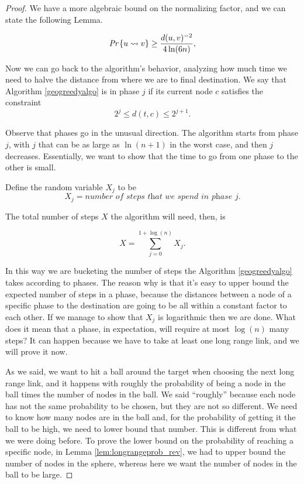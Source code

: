 \begin{proof}
We have a more algebraic bound on the normalizing factor, and we can state the following Lemma.
\begin{lem}\label{lem:longrangeprob_rev}
\begin{equation}
\emph{Pr}\left\{u \rightsquigarrow v\right\} \geq \frac{d(u, v)^{-2}}{4\ln(6n)},
\end{equation}	
\end{lem}

Now we can go back to the algorithm's behavior, analyzing how much time we need to halve the distance from where we are to final destination. We say that Algorithm \ref{geogreedyalgo} is in phase $j$ if its current node $c$ satisfies the constraint
\begin{equation}
2^j \leq d(t, c) \leq 2^{j + 1}.
\end{equation}

Observe that phases go in the unusual direction. The algorithm starts from phase $j$, with $j$ that can be as large as $\ln(n+1)$ in the worst case, and then  $j$ decreases. Essentially, we want to show that the time to go from one phase to the other is small. 

Define the random variable $X_j$ to be
\begin{equation}
X_j = \textit{number of steps that we spend in phase } j.
\end{equation}

The total number of steps $X$ the algorithm will need, then, is

\begin{equation}
X = \sum_{j = 0}^{1 + \log(n)}X_j.
\end{equation}

In this way we are bucketing the number of steps the Algorithm \ref{geogreedyalgo} takes according to phases. The reason why is that it's easy to upper bound the expected number of steps in a phase, because the distances between a node of a specific phase to the destination are going to be all within a constant factor to each other. If we manage to show that $X_j$ is logarithmic then we are done. What does it mean that a phase, in expectation, will require at most $\log(n)$ many steps? It can happen because we have to take at least one long range link, and we will prove it now.

As we said, we want to hit a ball around the target when choosing the next long range link, and  it happens with roughly the probability of being a node in the ball times the number of nodes in the ball. We said ``roughly'' because each node has not the same probability to be chosen, but they are not so different. We need to know how many nodes are in the ball and, for the probability of getting it the ball to be high, we need to lower bound that number. This is different from what we were doing before. To prove the lower bound on the probability of reaching a specific node, in Lemma \ref{lem:longrangeprob_rev}, we had to upper bound the number of nodes in the sphere, whereas here we want the number of nodes in the ball to be large.



\end{proof}

